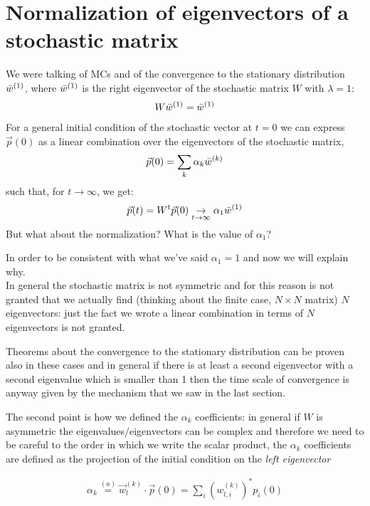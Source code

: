 \documentclass[\main/main.tex]{subfiles}
\begin{document}
\section{Normalization of eigenvectors of a stochastic matrix}
We were talking of MCs and of the convergence to the stationary distribution $\Bar{w}^{(1)}$, where $\Bar{w}^{(1)}$ is the right eigenvector of the stochastic matrix $W$ with $\lambda=1$:
\begin{eqnarray}
W\Bar{w}^{(1)}=\Bar{w}^{(1)}
\end{eqnarray}
For a general initial condition of the stochastic vector at $t=0$ we can express $\Vec{p}(0)$ as a linear combination over the eigenvectors of the stochastic matrix,
\begin{eqnarray}
\Vec{p}(0)=\sum_k \alpha_k \Bar{w}^{(k)}
\end{eqnarray}
such that, for $t\to\infty$, we get:
\begin{eqnarray}
\Vec{p}(t)=W^t\Vec{p}(0)\underset{t\to \infty}{\to} \alpha_1 \Bar{w}^{(1)}
\end{eqnarray}
But what about the normalization? What is the value of $\alpha_1$?

In order to be consistent with what we've said $\alpha_1=1$ and now we will explain why. \\

In general the stochastic matrix is not symmetric and for this reason is not granted that we actually find (thinking about the finite case, $N\times N$ matrix) $N$ eigenvectors: just the fact we wrote a linear combination in terms of $N$ eigenvectors is not granted.

Theorems about the convergence to the stationary distribution can be proven also in these cases and in general if there is at least a second eigenvector with a second eigenvalue which is smaller than 1 then the time scale of convergence is anyway given by the mechanism that we saw in the last section.

The second point is how we defined the $\alpha_k$ coefficients: in general if $W$ is asymmetric the eigenvalues/eigenvectors can be complex and therefore we need to be careful to the order in which we write the scalar product, the $\alpha_k$ coefficients are defined as the projection of the initial condition on the \textit{left eigenvector}

\begin{eqnarray}
\alpha_k \overset{(a)}{=} \Vec{w}^{(k)}_l \cdot \Vec{p}(0)=\sum_i (w_{l,i}^{(k)})^*p_i(0)
\label{eq:alpha}
\end{eqnarray}
\end{document}
